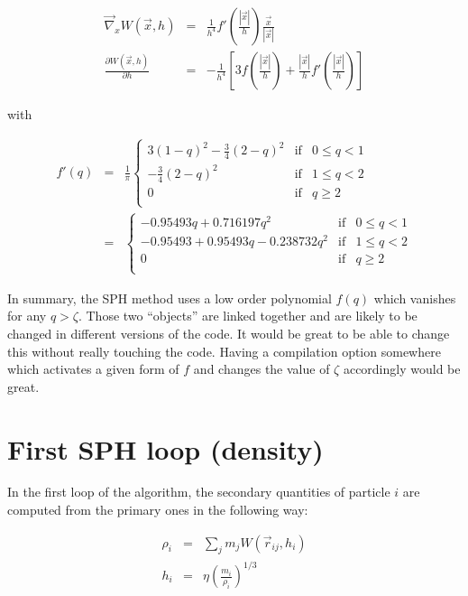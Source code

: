 \documentclass[a4paper,10pt]{report}
\begin{document}
\begin{eqnarray*}
 \vec\nabla_x W(\vec{x},h) &=& \frac{1}{h^4}f'\left(\frac{|\vec{x}|}{h}\right) \frac{\vec{x}}{|\vec{x}|} \\
 \frac{\partial W(\vec{x},h)}{\partial h} &=&- \frac{1}{h^4}\left[3f\left(\frac{|\vec{x}|}{h}\right) + 
\frac{|\vec{x}|}{h}f'\left(\frac{|\vec{x}|}{h}\right)\right]
\end{eqnarray*}

with

\begin{eqnarray*}
  f'(q)&=& \frac{1}{\pi}\left\lbrace \begin{array}{rcl}
                      3 \left(1-q\right)^2-\frac{3}{4} \left(2-q\right)^2 & \mbox{if} &
0 \leq q < 1 \\
 		      -\frac{3}{4} \left(2-q\right)^2 & \mbox{if} & 1 \leq q < 2 \\
		      0 & \mbox{if} & q \geq 2 \\
                     \end{array}
 \right. \\
&=&\left\lbrace \begin{array}{rcl}
    -0.95493 q + 0.716197 q^2& \mbox{if} & 0 \leq q < 1 \\
   -0.95493+0.95493 q-0.238732 q^2  & \mbox{if} & 1 \leq q < 2 \\
		      0 & \mbox{if} & q \geq 2 \\
                     \end{array}
 \right.
\end{eqnarray*}

In summary, the SPH method uses a low order polynomial $f(q)$ which vanishes for any $q>\zeta$. Those two ``objects''
are linked together and are likely to be changed in different versions of the code. It would be great to be able to
change this without really touching the code. 
Having a compilation option somewhere which activates a given form of $f$ and changes the value of $\zeta$ accordingly
would be great.

\section{First SPH loop (density)}
\label{sec:density}

In the first loop of the algorithm, the secondary quantities of particle $i$ are computed from the primary ones in the
following way:

\begin{eqnarray}
 \rho_i &=& \sum_j m_j W(\vec{r}_{ij}, h_i)\\
 h_i &=& \eta \left(\frac{m_i}{\rho_i} \right)^{1/3}
\end{eqnarray}
\end{document}
